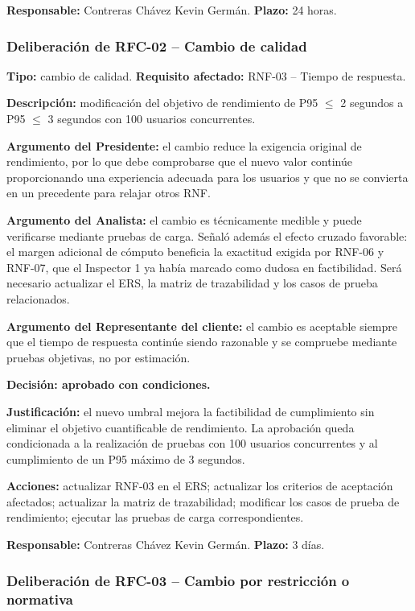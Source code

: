 \documentclass[journal,onecolumn]{IEEEtran}
\begin{document}
	\textbf{Responsable:} Contreras Chávez Kevin Germán. \quad \textbf{Plazo:} 24 horas.
	
	\subsubsection{Deliberación de RFC-02 -- Cambio de calidad}
	
	\textbf{Tipo:} cambio de calidad. \quad \textbf{Requisito afectado:} RNF-03 -- Tiempo de
	respuesta.
	
	\textbf{Descripción:} modificación del objetivo de rendimiento de P95 $\leq$ 2 segundos a
	P95 $\leq$ 3 segundos con 100 usuarios concurrentes.
	
	\textbf{Argumento del Presidente:} el cambio reduce la exigencia original de rendimiento, por lo
	que debe comprobarse que el nuevo valor continúe proporcionando una experiencia adecuada para los
	usuarios y que no se convierta en un precedente para relajar otros RNF.
	
	\textbf{Argumento del Analista:} el cambio es técnicamente medible y puede verificarse mediante
	pruebas de carga. Señaló además el efecto cruzado favorable: el margen adicional de cómputo
	beneficia la exactitud exigida por RNF-06 y RNF-07, que el Inspector 1 ya había marcado como
	dudosa en factibilidad. Será necesario actualizar el ERS, la matriz de trazabilidad y los casos de
	prueba relacionados.
	
	\textbf{Argumento del Representante del cliente:} el cambio es aceptable siempre que el tiempo de
	respuesta continúe siendo razonable y se compruebe mediante pruebas objetivas, no por estimación.
	
	\textbf{Decisión: aprobado con condiciones.}
	
	\textbf{Justificación:} el nuevo umbral mejora la factibilidad de cumplimiento sin eliminar el
	objetivo cuantificable de rendimiento. La aprobación queda condicionada a la realización de
	pruebas con 100 usuarios concurrentes y al cumplimiento de un P95 máximo de 3 segundos.
	
	\textbf{Acciones:} actualizar RNF-03 en el ERS; actualizar los criterios de aceptación afectados;
	actualizar la matriz de trazabilidad; modificar los casos de prueba de rendimiento; ejecutar las
	pruebas de carga correspondientes.
	
	\textbf{Responsable:} Contreras Chávez Kevin Germán. \quad \textbf{Plazo:} 3 días.
	
	\subsubsection{Deliberación de RFC-03 -- Cambio por restricción o normativa}
	
\end{document}
